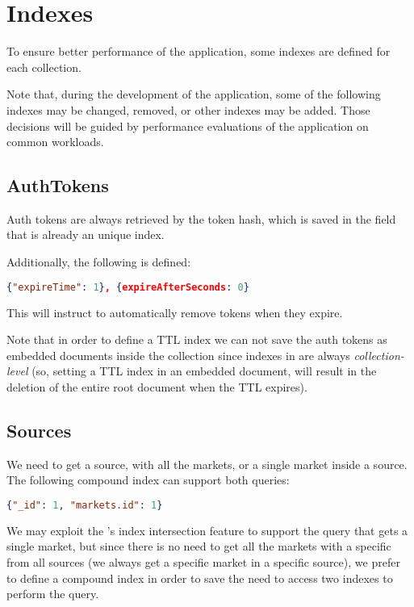 \section{Indexes}\label{sec:indexes}

To ensure better performance of the application, some indexes are defined for
each collection.

Note that, during the development of the application, some of the following
indexes may be changed, removed, or other indexes may be added. Those decisions
will be guided by performance evaluations of the application on common
workloads.

\subsection{AuthTokens}

Auth tokens are always retrieved by the token hash, which is saved in the
 field that is already an unique index.

Additionally, the following  is defined:

\begin{lstlisting}[language=json]
{"expireTime": 1}, {expireAfterSeconds: 0}
\end{lstlisting}

This will instruct \mongodb{} to automatically remove tokens when they expire.

Note that in order to define a TTL index we can not save the auth tokens as
embedded documents inside the  collection since indexes in
\mongodb{} are always \emph{collection-level} (so, setting a TTL index in an
embedded document, will result in the deletion of the entire root document when
the TTL expires).

\subsection{Sources}

We need to get a source, with all the markets, or a single market inside a
source. The following compound index can support both queries:

\begin{lstlisting}[language=json]
{"_id": 1, "markets.id": 1}
\end{lstlisting}

We may exploit the \mongodb's index intersection feature to support the query
that gets a single market, but since there is no need to get all the markets
with a specific  from all sources (we always get a specific market in a
specific source), we prefer to define a compound index in order to save
\mongodb{} the need to access two indexes to perform the query.

